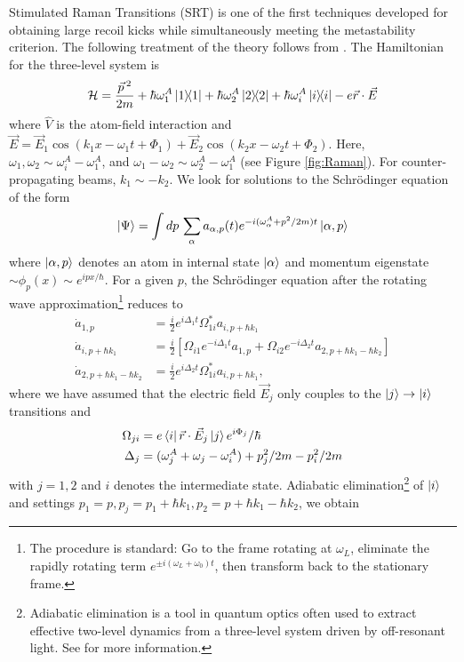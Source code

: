 \documentclass[reprint,
nofootinbib,
amsmath,amssymb,
aps]{revtex4-1}
\newcommand{\al}{\alpha}
\newcommand{\f}[2]{\frac{#1}{#2}}
\newcommand{\lb}{\left[}
\newcommand{\rb}{\right]}
\begin{document}
Stimulated Raman Transitions (SRT) is one of the first techniques developed for obtaining large recoil kicks while simultaneously meeting the metastability criterion. The following treatment of the theory follows from \cite{kasevich1992measurement}. The Hamiltonian for the three-level system is 
\begin{align*}
\mathcal{H} = \f{\vec{p}\,^2}{2m} + \hbar \omega_1^A \ketbra{1} + \hbar \omega_2^A \ketbra{2} + \hbar \omega_i^A \ketbra{i} - e\vec{r}\cdot \vec{E}
\end{align*}
where $\hat{V}$ is the atom-field interaction and $\vec{E} = \vec{E}_1 \cos(k_1 x - \omega_1 t + \Phi_1) + \vec{E}_2 \cos(k_2 x - \omega_2 t + \Phi_2)$. Here, $\omega_1, \omega_2 \sim \omega^A_i - \omega_1^A$, and $\omega_1 - \omega_2 \sim \omega_2^A - \omega_1^A$ (see Figure \ref{fig:Raman}). For counter-propagating beams, $k_1 \sim -k_2$. We look for solutions to the Schr\"{o}dinger equation of the form 
\begin{align*}
\ket{\Psi} = \int dp\, \sum_\al a_{\al,p}(t) e^{-i(\omega_\al^A + p^2/2m) t } \ket{\al,p}
\end{align*}
where $\ket{\al,p}$ denotes an atom in internal state $\ket{\al}$ and momentum eigenstate $\sim \phi_p(x) \sim e^{ipx/\hbar}$. For a given $p$, the Schr\"{o}dinger equation after the rotating wave approximation\footnote{The procedure is standard: Go to the frame rotating at $\omega_L$, eliminate the rapidly rotating term $e^{\pm i(\omega_L+\omega_0)t}$, then transform back to the stationary frame.} reduces to 
\begin{align*}
\dot{a}_{1,p} &= \f{i}{2}e^{i\Delta_1 t} \Omega^*_{1i} a_{i,p+\hbar k_1}\\
\dot{a}_{i,p + \hbar k_1} &= \f{i}{2}\lb \Omega_{i1}e^{-i\Delta_1 t } a_{1,p}+ \Omega_{i2} e^{-i\Delta_2 t}a_{2,p+\hbar k_1 - \hbar k_2} \rb \\
\dot{a}_{2,p+\hbar k_1 - \hbar k_2} &= \f{i}{2}e^{i\Delta_2 t}\Omega_{1i}^* a_{i,p+\hbar k_1},
\end{align*}
where we have assumed that the electric field $\vec{E}_j$ only couples to the $\ket{j} \to \ket{i}$ transitions and 
\begin{align*}
\Omega_{ji} &= e\bra{i} \vec{r}\cdot \vec{E}_j \ket{j} e^{i\Phi_j}/\hbar\\
\Delta_j &= (\omega_j^A + \omega_j - \omega_i^A) + p_j^2/2m - p_i^2/2m
\end{align*}
with $j=1,2$ and $i$ denotes the intermediate state. Adiabatic elimination\footnote{Adiabatic elimination is a tool in quantum optics often used to extract effective two-level dynamics from a three-level system driven by off-resonant light. See \cite{brion2007adiabatic} for more information. } of $\ket{i}$ and settings $p_1 = p, p_j = p_1 + \hbar k_1, p_2 = p+ \hbar k_1 - \hbar k_2$, we obtain 
\end{document}
